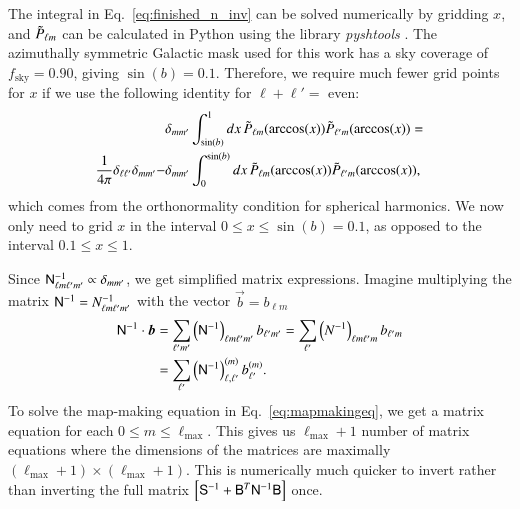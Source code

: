 \documentclass[twocolumn]{aa}
\newcommand{\B}[0]{\tens{B}}
\newcommand{\N}[0]{\tens{N}}
\renewcommand{\S}[0]{\tens{S}}
\begin{document}
The integral in Eq.~\eqref{eq:finished_n_inv} can be solved numerically by gridding $x$, and $\Tilde{P}_{\ell m}$ can be calculated in Python using the library \textit{pyshtools} \citep{https://doi.org/10.1029/2018GC007529}. The azimuthally symmetric Galactic mask used for this work has a sky coverage of $f_{\mathrm{sky}} = 0.90$, giving $\sin(b) = 0.1$. Therefore, we require much fewer grid points for $x$ if we use the following identity for $\ell+\ell' = $ even:
\begin{align}
&\delta_{mm'} \int_{\sin(b)}^{1} dx \, \Tilde{P}_{\ell m}(\arccos(x)) \Tilde{P}_{\ell' m}(\arccos(x)) = \\
\frac{1}{4\pi}\delta_{\ell \ell'}\delta_{m m'} - &\delta_{mm'} \int_{0}^{\sin(b)} dx \, \Tilde{P}_{\ell m}(\arccos(x)) \Tilde{P}_{\ell' m}(\arccos(x)),
\end{align}
which comes from the orthonormality condition for spherical harmonics. We now only need to grid $x$ in the interval $0\leq x \leq \sin(b) = 0.1$, as opposed to the interval $0.1 \leq x \leq 1$.

Since $\N^{-1}_{\ell m \ell' m'} \propto \delta_{m m'}$, we get simplified matrix expressions. Imagine multiplying the matrix $\N^{-1} = N^{-1}_{\ell m \ell' m'}$ with the vector $\vec{b} = b_{\ell m}$
\begin{align}
\N^{-1} \cdot \vec{b} &= \sum_{\ell' m'}\left(\N^{-1}\right)_{\ell m \ell' m'}b_{\ell' m'} = \sum_{\ell'}\left(N^{-1}\right)_{\ell m \ell' m}b_{\ell' m}\\
&= \sum_{\ell' }\left(\N^{-1}\right)^{(m)}_{\ell, \ell'}b^{(m)}_{\ell'}.
\end{align}
To solve the map-making equation in Eq.~\eqref{eq:mapmakingeq}, we get a matrix equation for each $0 \leq m \leq \ell_{\mathrm{max}}$. This gives us $\ell_{\textrm{max}}+1$ number of matrix equations where the dimensions of the matrices are maximally $(\ell_{\textrm{max}}+1) \times (\ell_{\textrm{max}}+1)$. This is numerically much quicker to invert rather than inverting the full matrix $\left[\S^{-1} + \B^T \N^{-1}\B \right]$ once.
\end{document}
